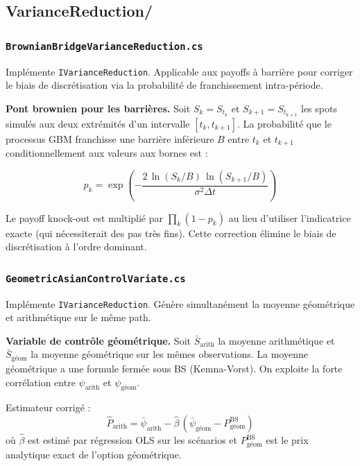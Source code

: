 \documentclass[a4paper,11pt]{article}
\newcommand{\cs}[1]{\texttt{\color{codeinline}#1}}
\begin{document}
\subsection{VarianceReduction/}

\subsubsection{\texttt{BrownianBridgeVarianceReduction.cs}}

Impl\'emente \cs{IVarianceReduction}. Applicable aux payoffs \`a barri\`ere pour
corriger le biais de discr\'etisation via la probabilit\'e de franchissement intra-p\'eriode.

\begin{tcolorbox}[math]
\textbf{Pont brownien pour les barrières.} Soit $S_k = S_{t_k}$ et $S_{k+1} = S_{t_{k+1}}$
les spots simulés aux deux extrémités d'un intervalle $[t_k, t_{k+1}]$. La probabilit\'e
que le processus GBM franchisse une barri\`ere inf\'erieure $B$ entre $t_k$ et $t_{k+1}$
conditionnellement aux valeurs aux bornes est :

\[
  p_k = \exp\!\left(-\frac{2\,\ln(S_k/B)\,\ln(S_{k+1}/B)}{\sigma^2\Delta t}\right)
\]

Le payoff knock-out est multipli\'e par $\prod_k (1 - p_k)$ au lieu d'utiliser
l'indicatrice exacte (qui n\'ecessiterait des pas tr\`es fins). Cette correction
\'elimine le biais de discr\'etisation \`a l'ordre dominant.
\end{tcolorbox}

\subsubsection{\texttt{GeometricAsianControlVariate.cs}}

Impl\'emente \cs{IVarianceReduction}. G\'en\`ere simultan\'ement la moyenne g\'eom\'etrique
et arithm\'etique sur le m\^eme path.

\begin{tcolorbox}[math]
\textbf{Variable de contr\^ole g\'eom\'etrique.} Soit $\bar{S}_\text{arith}$ la moyenne
arithm\'etique et $\bar{S}_\text{g\'eom}$ la moyenne g\'eom\'etrique sur les m\^emes
observations. La moyenne g\'eom\'etrique a une formule ferm\'ee sous BS (Kemna-Vorst).
On exploite la forte corr\'elation entre $\psi_\text{arith}$ et $\psi_\text{g\'eom}$.

Estimateur corrig\'e :
\[
  \hat{P}_\text{arith} = \bar{\psi}_\text{arith}
    - \hat{\beta}\,(\bar{\psi}_\text{g\'eom} - P_\text{g\'eom}^{\text{BS}})
\]
o\`u $\hat{\beta}$ est estim\'e par r\'egression OLS sur les sc\'enarios et
$P_\text{g\'eom}^{\text{BS}}$ est le prix analytique exact de l'option g\'eom\'etrique.
\end{tcolorbox}
\end{document}
